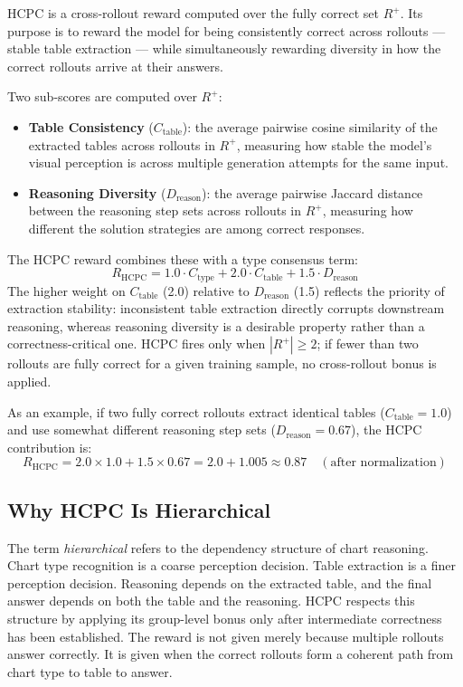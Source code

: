 \documentclass{iutbscthesis}
\begin{document}
HCPC is a cross-rollout reward computed over the fully correct set $R^+$. Its purpose is to reward the model for being consistently correct across rollouts --- stable table extraction --- while simultaneously rewarding diversity in how the correct rollouts arrive at their answers.

Two sub-scores are computed over $R^+$:
\begin{itemize}
    \item \textbf{Table Consistency} ($C_{\text{table}}$): the average pairwise cosine similarity of the extracted tables across rollouts in $R^+$, measuring how stable the model's visual perception is across multiple generation attempts for the same input.
    \item \textbf{Reasoning Diversity} ($D_{\text{reason}}$): the average pairwise Jaccard distance between the reasoning step sets across rollouts in $R^+$, measuring how different the solution strategies are among correct responses.
\end{itemize}
The HCPC reward combines these with a type consensus term:
\begin{equation}
    R_{\text{HCPC}} = 1.0 \cdot C_{\text{type}} + 2.0 \cdot C_{\text{table}} + 1.5 \cdot D_{\text{reason}}
\end{equation}
The higher weight on $C_{\text{table}}$ (2.0) relative to $D_{\text{reason}}$ (1.5) reflects the priority of extraction stability: inconsistent table extraction directly corrupts downstream reasoning, whereas reasoning diversity is a desirable property rather than a correctness-critical one. HCPC fires only when $|R^+| \geq 2$; if fewer than two rollouts are fully correct for a given training sample, no cross-rollout bonus is applied.

As an example, if two fully correct rollouts extract identical tables ($C_{\text{table}} = 1.0$) and use somewhat different reasoning step sets ($D_{\text{reason}} = 0.67$), the HCPC contribution is:
\begin{equation}
    R_{\text{HCPC}} = 2.0 \times 1.0 + 1.5 \times 0.67 = 2.0 + 1.005 \approx 0.87 \quad (\text{after normalization})
\end{equation}

\subsection{Why HCPC Is Hierarchical}

The term \emph{hierarchical} refers to the dependency structure of chart reasoning. Chart type recognition is a coarse perception decision. Table extraction is a finer perception decision. Reasoning depends on the extracted table, and the final answer depends on both the table and the reasoning. HCPC respects this structure by applying its group-level bonus only after intermediate correctness has been established. The reward is not given merely because multiple rollouts answer correctly. It is given when the correct rollouts form a coherent path from chart type to table to answer.
\end{document}
